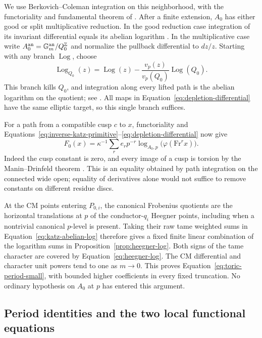 We use Berkovich--Coleman integration on this neighborhood, with the
functoriality and fundamental theorem of
\cite[Definition~3.5]{KatzRabinoffZureickBrown2016}.  After a finite
extension, $A_0$ has either good or split multiplicative reduction.  In
the good reduction case integration of its invariant differential
equals its abelian logarithm
\cite[Corollary~3.18]{KatzRabinoffZureickBrown2016}.  In the
multiplicative case write $A_0^{\mathrm{an}}=\mathbb G_m^{\mathrm{an}}/Q_0^{\mathbb Z}$
and normalize the pullback differential to $dz/z$.  Starting with any
branch $\operatorname{Log}$, choose
\[
 \operatorname{Log}_{Q_0}(z)
 =\operatorname{Log}(z)
  -\frac{v_p(z)}{v_p(Q_0)}\operatorname{Log}(Q_0).
\]
This branch kills $Q_0$, and integration along every lifted path is the
abelian logarithm on the quotient; see
\cite[Example~3.11]{KatzRabinoffZureickBrown2016}.  All maps in
Equation~\ref{eq:depletion-differential} have the same elliptic target,
so this single branch suffices.

For a path from a compatible cusp $c$ to $x$, functoriality and
Equations~\ref{eq:inverse-katz-primitive}--\ref{eq:depletion-differential}
now give
\begin{equation}\label{eq:katz-abelian-log}
 F_0(x)=\kappa^{-1}\sum_r e_rp^{-r}
 \log_{A_0,p}\bigl(\varphi(\mathrm{Fr}^{r}x)\bigr).
\end{equation}
Indeed the cusp constant is zero, and every image of a cusp is torsion
by the Manin--Drinfeld theorem \citep{Manin1972,Drinfeld1973}.
This is an equality obtained by path integration on the connected wide
open; equality of derivatives alone would not suffice to remove
constants on different residue discs.

At the CM points entering $P_{0,i}$, the canonical Frobenius quotients
are the horizontal translations at $p$ of the conductor-$q_i$ Heegner
points, including when a nontrivial canonical $p$-level is present.
Taking their raw tame weighted sums in Equation~\ref{eq:katz-abelian-log}
therefore gives a fixed finite linear combination of the logarithm sums
in Proposition~\ref{prop:heegner-log}.  Both signs of the tame character
are covered by Equation~\ref{eq:heegner-log}.  The CM differential and
character unit powers tend to one as $m\to0$.  This proves
Equation~\ref{eq:toric-period-small}, with bounded higher coefficients
in every fixed truncation.  No ordinary hypothesis on $A_0$ at $p$ has
entered this argument.

\subsection{Period identities and the two local functional equations}


